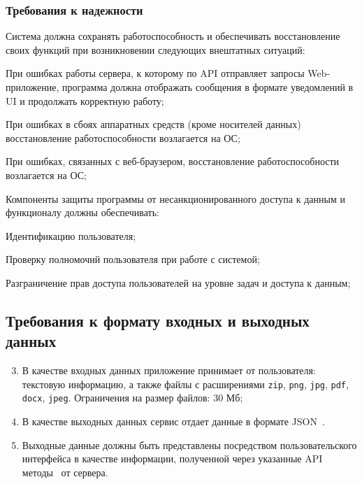 \documentclass[a4paper,12pt,reqno]{article}
\begin{document}
	\subsubsection{Требования к надежности}
	
 
	
	\begin{nfr}
	    \item Система должна сохранять работоспособность и обеспечивать восстановление своих функций при возникновении следующих внештатных ситуаций:
	    \begin{nfr}
	    \item При ошибках работы сервера, к которому по API отправляет запросы Web-приложение, программа должна отображать сообщения в формате уведомлений в UI и продолжать корректную работу;
        \item При ошибках в сбоях аппаратных средств (кроме носителей данных) восстановление работоспособности возлагается на ОС;
        \item При ошибках, связанных с веб-браузером, восстановление работоспособности возлагается на ОС;
	\end{nfr}
	\item Компоненты защиты программы от несанкционированного доступа к данным и функционалу должны обеспечивать:
	\begin{nfr}
	\item Идентификацию пользователя;
	\item Проверку полномочий пользователя при работе с системой;
	\item Разграничение прав доступа пользователей на уровне задач и доступа к данным;
    \end{nfr}
	\end{nfr}
    
    \subsection{Требования к формату входных и выходных данных}

	\begin{enumerate}
		\setcounter{enumii}{2}
		\item В качестве входных данных приложение принимает от пользователя: текстовую информацию, а также файлы с расширениями \texttt{zip},  \texttt{png}, \texttt{jpg}, \texttt{pdf}, \texttt{docx}, \texttt{jpeg}. Ограничения на размер файлов: 30 Мб;
		\item В качестве выходных данных сервис отдает данные в формате JSON~\cite{json}.
		\item Выходные данные должны быть представлены посредством пользовательского интерфейса в качестве информации, полученной через указанные API методы~\cite{api} от сервера. 
	\end{enumerate}
	
\end{document}
